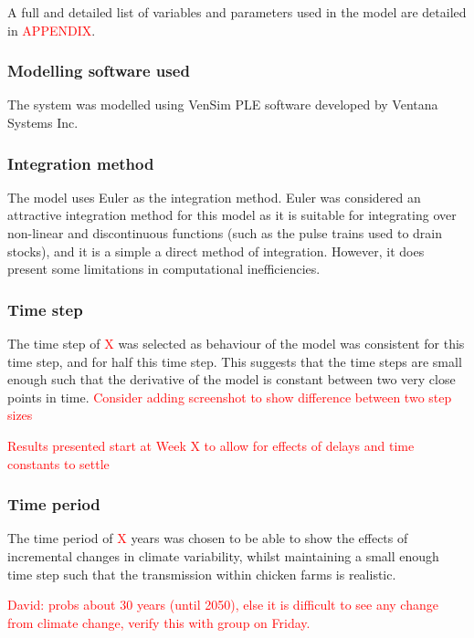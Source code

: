 A full and detailed list of variables and parameters used in the model are detailed in \textcolor{red}{APPENDIX}.
\subsubsection{Modelling software used}
The system was modelled using VenSim PLE software developed by Ventana Systems Inc.
    
\subsubsection{Integration method}
The model uses Euler as the integration method. Euler was considered an attractive integration method for this model as it is suitable for integrating over non-linear and discontinuous functions (such as the pulse trains used to drain stocks), and it is a simple a direct method of integration. However, it does present some limitations in computational inefficiencies.

\subsubsection{Time step}
The time step of \textcolor{red}{X} was selected as behaviour of the model was consistent for this time step, and for half this time step. This suggests that the time steps are small enough such that the derivative of the model is constant between two very close points in time.
\textcolor{red}{Consider adding screenshot to show difference between two step sizes}

\textcolor{red}{Results presented start at Week X to allow for effects of delays and time constants to settle}

\subsubsection{Time period}
The time period of \textcolor{red}{X} years was chosen to be able to show the effects of incremental changes in climate variability, whilst maintaining a small enough time step such that the transmission within chicken farms is realistic.

\textcolor{red}{David: probs about 30 years (until 2050), else it is difficult to see any change from climate change, verify this with group on Friday.}

